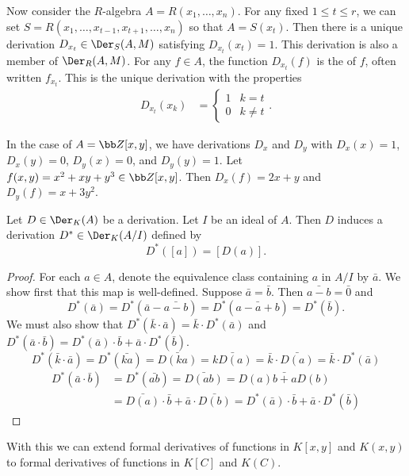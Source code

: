 Now consider the $R$-algebra $A = R(x_1, \ldots, x_n)$.
For any fixed $1 \leq t \leq r$, we can set $S = R(x_1, \ldots, x_{t-1}, x_{t+1}, \ldots, x_n)$
so that $A = S(x_t)$.
Then there is a unique derivation $D_{x_t} \in \Der_S(A,M)$ satisfying $D_{x_t}(x_t) = 1$.
This derivation is also a member of $\Der_R(A,M)$.
For any $f \in A$, the function $D_{x_t}(f)$ is the  of $f$, often written $f_{x_t}$.
This is the unique derivation with the properties
\begin{align*}
  D_{x_t}(x_k) &= \begin{cases} 1 & k = t \\ 0 & k \neq t \end{cases}.
\end{align*}
\begin{example}
  In the case of $A = \bb Z[x,y]$, we have derivations $D_x$ and $D_y$ with
  $D_x(x) = 1$, $D_x(y) = 0$, $D_y(x) = 0$, and $D_y(y) = 1$.
  Let $f(x,y) = x^2 + xy + y^3 \in \bb Z[x,y]$.
  Then $D_x(f) = 2x + y$ and $D_y(f) = x + 3y^2$.
\end{example}

\begin{proposition}
  Let $D \in \Der_K(A)$ be a derivation.
  Let $I$ be an ideal of $A$.
  Then $D$ induces a derivation $D^* \in \Der_K(A/I)$ defined by
    \[ D^*([a]) = [D(a)]. \]
\end{proposition}
\begin{proof}
  For each $a \in A$, denote the equivalence class containing $a$ in $A/I$ by $\bar a$.
  We show first that this map is well-defined.
  Suppose $\bar a = \bar b$.
  Then $\bar{a-b} = \bar 0$ and
    \[ D^*(\bar a) = D^*(\bar a - \bar{a-b}) = D^*(\bar{a-a+b}) = D^*(\bar b). \]
  We must also show that $D^*(\bar k \cdot \bar a) = \bar k \cdot D^*(\bar a)$
  and $D^*(\bar a \cdot \bar b) = D^*(\bar a) \cdot \bar b + \bar a \cdot D^*(\bar b)$.
    \[ D^*(\bar k \cdot \bar a) = D^*(\bar{ka}) = \bar{D(ka)} = \bar{kD(a)} = \bar k \cdot \bar{D(a)} = \bar k \cdot D^*(\bar a) \]
  \begin{align*}
    D^*(\bar a \cdot \bar b)
      &= D^*(\bar{ab})
       = \bar{D(ab)}
       = \bar{D(a)b + aD(b)} \\
       &= \bar{D(a)} \cdot \bar b + \bar a \cdot \bar{D(b)}
       = D^*(\bar a) \cdot \bar b + \bar a \cdot D^*(\bar b)
  \end{align*}
\end{proof}
With this we can extend formal derivatives of functions in $K[x,y]$ and $K(x,y)$ to formal derivatives of functions in $K[C]$ and $K(C)$.


